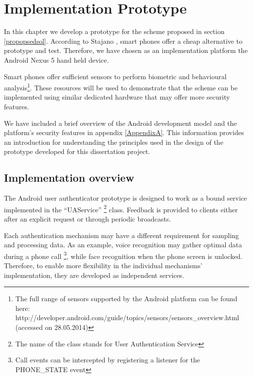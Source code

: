 
\chapter{Implementation Prototype} %

\label{Chapter4} %

In this chapter we develop a prototype for the scheme proposed in section \ref{propopsedsol}. According to Stajano \cite{stajano2011pico}, smart phones offer a cheap alternative to prototype and test. Therefore, we have chosen as an implementation platform the Android Nexus 5 hand held device. 

Smart phones offer sufficient sensors to perform biometric and behavioural analysis\footnote{The full range of sensors supported by the Android platform can be found here: http://developer.android.com/guide/topics/sensors/sensors\_overview.html (accessed on 28.05.2014)}. These resources will be used to demonstrate that the scheme can be implemented using similar dedicated hardware that may offer more security features.

We have included a brief overview of the Android development model and the platform's security features in appendix \ref{AppendixA}. This information provides an introduction for understanding the principles used in the design of the prototype developed for this dissertation project.

\section{Implementation overview}
The Android user authenticator prototype is designed to work as a bound service implemented in the ``UAService'' \footnote{The name of the class stands for User Authentication Service} class. Feedback is provided to clients either after an explicit request or through periodic broadcasts.

Each authentication mechanism may have a different requirement for sampling and processing data. As an example, voice recognition may gather optimal data during a phone call \footnote{Call events can be intercepted by registering a listener for the PHONE\_STATE event}, while face recognition when the phone screen is unlocked. Therefore, to enable more flexibility in the individual mechanisms' implementation, they are developed as independent services.

